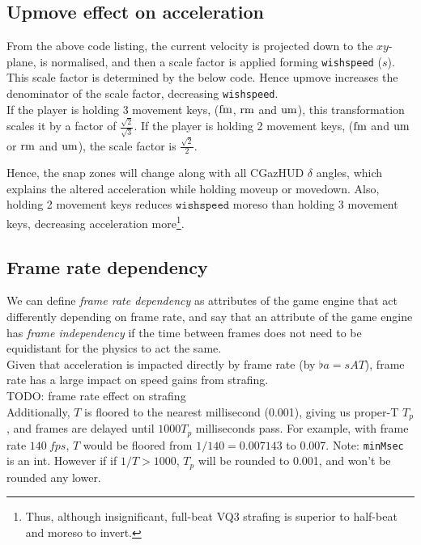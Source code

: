 \subsection{Upmove effect on acceleration}
\label{sec:upmove}
From the above code listing, the current velocity is projected down to the $xy$-plane, is normalised, and then a scale factor is applied forming \texttt{wishspeed} ($s$).
This scale factor is determined by the below code.
Hence upmove increases the denominator of the scale factor, decreasing \texttt{wishspeed}.\\
If the player is holding 3 movement keys, ($\operatorname{fm}$, $\operatorname{rm}$ and $\operatorname{um}$), this transformation scales it by a factor of $\frac{\sqrt{2}}{\sqrt{3}}$.
If the player is holding 2 movement keys, ($\operatorname{fm}$ and $\operatorname{um}$ or $\operatorname{rm}$ and $\operatorname{um}$), the scale factor is $\frac{\sqrt{2}}{2}$.

Hence, the snap zones will change along with all CGazHUD $\delta$ angles, which explains the altered acceleration while holding moveup or movedown.
Also, holding 2 movement keys reduces $\texttt{wishspeed}$ moreso than holding 3 movement keys, decreasing acceleration more\footnote{Thus, although insignificant, full-beat VQ3 strafing is superior to half-beat and moreso to invert.}.


\subsection{Frame rate dependency}
\label{sec:framerate}
We can define \emph{frame rate dependency} as attributes of the game engine that act differently depending on frame rate,
and say that an attribute of the game engine has \emph{frame independency} if the time between frames does not need to be equidistant for the physics to act the same.\\

Given that acceleration is impacted directly by frame rate (by $\flat{a} = sAT$), frame rate has a large impact on speed gains from strafing.\\
TODO: frame rate effect on strafing\\

Additionally, $T$ is floored to the nearest millisecond (0.001), giving us proper-T $T_p$, and frames are delayed until $1000T_p$ milliseconds pass.
For example, with frame rate $\qty{140}{fps}$, $T$ would be floored from $1/140 = 0.007143$ to 0.007. Note: \texttt{minMsec} is an int.
However if if $1/T > 1000$, $T_p$ will be rounded to 0.001, and won't be rounded any lower.

